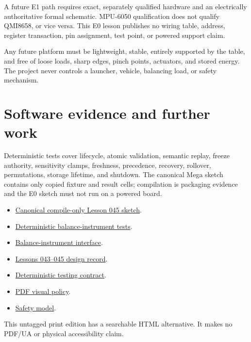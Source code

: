 \documentclass[11pt]{article}
\begin{document}
A future E1 path requires exact, separately qualified hardware and an
electrically authoritative formal schematic. MPU-6050 qualification does not
qualify QMI8658, or vice versa. This E0 lesson publishes no wiring table,
address, register transaction, pin assignment, test point, or powered support
claim.

Any future platform must be lightweight, stable, entirely supported by the
table, and free of loose loads, sharp edges, pinch points, actuators, and
stored energy. The project never controls a launcher, vehicle, balancing
load, or safety mechanism.

\section{Software evidence and further work}
Deterministic tests cover lifecycle, atomic validation, semantic replay,
freeze authority, sensitivity clamps, freshness, precedence, recovery,
rollover, permutations, storage lifetime, and shutdown. The canonical Mega
sketch contains only copied fixture and result cells; compilation is packaging
evidence and the E0 sketch must not run on a powered board.

\begin{itemize}
 \item \href{https://github.com/spincyc/adk/blob/main/examples/Lesson045BalanceTableInstrument/Lesson045BalanceTableInstrument.ino}
       {Canonical compile-only Lesson 045 sketch}.
 \item \href{https://github.com/spincyc/adk/blob/main/tests/test_balance_table_instrument.cpp}
       {Deterministic balance-instrument tests}.
 \item \href{https://github.com/spincyc/adk/blob/main/src/balance_table_instrument.h}
       {Balance-instrument interface}.
 \item \href{https://github.com/spincyc/adk/blob/main/docs/design/LESSONS_043_045_BALANCE_TABLE_PLAN.md}
       {Lessons 043--045 design record}.
 \item \href{https://github.com/spincyc/adk/blob/main/docs/TESTING.md}
       {Deterministic testing contract}.
 \item \href{https://github.com/spincyc/adk/blob/main/docs/PDF_POLICY.md}
       {PDF visual policy}.
 \item \href{https://github.com/spincyc/adk/blob/main/docs/SAFETY_MODEL.md}
       {Safety model}.
\end{itemize}

This untagged print edition has a searchable HTML alternative.
It makes no PDF/UA or physical accessibility claim.
\end{document}

